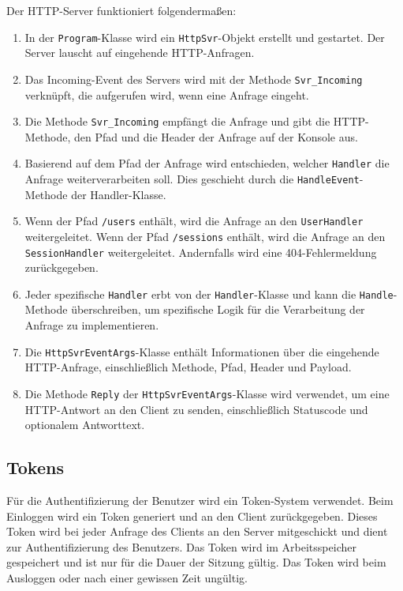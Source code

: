 \documentclass[a4paper, 12pt]{article}
\begin{document}
Der HTTP-Server funktioniert folgendermaßen:
\begin{enumerate}
    \item In der \texttt{Program}-Klasse wird ein \texttt{HttpSvr}-Objekt erstellt und gestartet. Der Server lauscht auf eingehende HTTP-Anfragen.
    \item Das Incoming-Event des Servers wird mit der Methode \texttt{Svr\_Incoming} verknüpft, die aufgerufen wird, wenn eine Anfrage eingeht.
    \item Die Methode \texttt{Svr\_Incoming} empfängt die Anfrage und gibt die HTTP-Methode, den Pfad und die Header der Anfrage auf der Konsole aus.
    \item Basierend auf dem Pfad der Anfrage wird entschieden, welcher \texttt{Handler} die Anfrage weiterverarbeiten soll. Dies geschieht durch die \texttt{HandleEvent}-Methode der {Handler}-Klasse.
    \item Wenn der Pfad \texttt{/users} enthält, wird die Anfrage an den \texttt{UserHandler} weitergeleitet. Wenn der Pfad \texttt{/sessions} enthält, wird die Anfrage an den \texttt{SessionHandler} weitergeleitet. Andernfalls wird eine 404-Fehlermeldung zurückgegeben.
    \item Jeder spezifische \texttt{Handler} erbt von der \texttt{Handler}-Klasse und kann die \texttt{Handle}-Methode überschreiben, um spezifische Logik für die Verarbeitung der Anfrage zu implementieren.
    \item Die \texttt{HttpSvrEventArgs}-Klasse enthält Informationen über die eingehende HTTP-Anfrage, einschließlich Methode, Pfad, Header und Payload.
    \item Die Methode \texttt{Reply} der \texttt{HttpSvrEventArgs}-Klasse wird verwendet, um eine HTTP-Antwort an den Client zu senden, einschließlich Statuscode und optionalem Antworttext.
\end{enumerate}

\subsection{Tokens}
Für die Authentifizierung der Benutzer wird ein Token-System verwendet. Beim Einloggen wird ein Token generiert und an den Client zurückgegeben. Dieses Token wird bei jeder Anfrage des Clients an den Server mitgeschickt und dient zur Authentifizierung des Benutzers. Das Token wird im Arbeitsspeicher gespeichert und ist nur für die Dauer der Sitzung gültig. Das Token wird beim Ausloggen oder nach einer gewissen Zeit ungültig.
\end{document}
